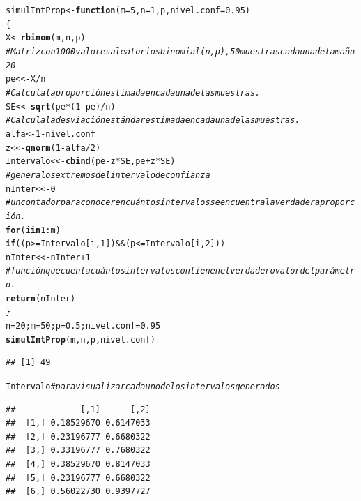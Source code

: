 \documentclass[12pt,letterpaper]{article}\usepackage[]{graphicx}\usepackage[]{color}
\makeatletter
\newcommand{\hlnum}[1]{\textcolor[rgb]{0.686,0.059,0.569}{#1}}%
\newcommand{\hlcom}[1]{\textcolor[rgb]{0.678,0.584,0.686}{\textit{#1}}}%
\newcommand{\hlopt}[1]{\textcolor[rgb]{0,0,0}{#1}}%
\newcommand{\hlstd}[1]{\textcolor[rgb]{0.345,0.345,0.345}{#1}}%
\newcommand{\hlkwa}[1]{\textcolor[rgb]{0.161,0.373,0.58}{\textbf{#1}}}%
\newcommand{\hlkwb}[1]{\textcolor[rgb]{0.69,0.353,0.396}{#1}}%
\newcommand{\hlkwc}[1]{\textcolor[rgb]{0.333,0.667,0.333}{#1}}%
\newcommand{\hlkwd}[1]{\textcolor[rgb]{0.737,0.353,0.396}{\textbf{#1}}}%
\newenvironment{kframe}{%
 \def\at@end@of@kframe{}%
 \ifinner\ifhmode%
  \def\at@end@of@kframe{\end{minipage}}%
  \begin{minipage}{\columnwidth}%
 \fi\fi%
 \def\FrameCommand##1{\hskip\@totalleftmargin \hskip-\fboxsep
 \colorbox{shadecolor}{##1}\hskip-\fboxsep
     \hskip-\linewidth \hskip-\@totalleftmargin \hskip\columnwidth}%
 \MakeFramed {\advance\hsize-\width
   \@totalleftmargin\z@ \linewidth\hsize
   \@setminipage}}%
 {\par\unskip\endMakeFramed%
 \at@end@of@kframe}
\newenvironment{knitrout}{}{} %
\makeatother
\begin{document}
\begin{knitrout}
\color{fgcolor}\begin{kframe}
\begin{alltt}
\hlstd{simulIntProp} \hlkwb{<-} \hlkwa{function}\hlstd{(}\hlkwc{m}\hlstd{=}\hlnum{5}\hlstd{,} \hlkwc{n}\hlstd{=}\hlnum{1}\hlstd{,} \hlkwc{p}\hlstd{,} \hlkwc{nivel.conf}\hlstd{=}\hlnum{0.95}\hlstd{)}
\hlstd{\{}
\hlstd{X} \hlkwb{<-} \hlkwd{rbinom}\hlstd{(m, n, p)}
\hlcom{# Matriz con 1000 valores aleatorios binomial(n,p), 50 muestras cada una de tamaño 20 }
\hlstd{pe} \hlkwb{<<-} \hlstd{X}\hlopt{/}\hlstd{n}
 \hlcom{# Calcula la proporción estimada en cada una de las muestras. }
\hlstd{SE} \hlkwb{<<-} \hlkwd{sqrt}\hlstd{(pe}\hlopt{*}\hlstd{(}\hlnum{1}\hlopt{-}\hlstd{pe)}\hlopt{/}\hlstd{n)}
\hlcom{# Calcula la desviación estándar estimada en cada una de las muestras. }
\hlstd{alfa} \hlkwb{<-} \hlnum{1}\hlopt{-}\hlstd{nivel.conf}
\hlstd{z} \hlkwb{<<-} \hlkwd{qnorm}\hlstd{(}\hlnum{1}\hlopt{-}\hlstd{alfa}\hlopt{/}\hlnum{2}\hlstd{)}
\hlstd{Intervalo} \hlkwb{<<-} \hlkwd{cbind}\hlstd{(pe} \hlopt{-} \hlstd{z}\hlopt{*}\hlstd{SE, pe} \hlopt{+} \hlstd{z}\hlopt{*}\hlstd{SE)}
\hlcom{# genera los extremos del intervalo de confianza }
\hlstd{nInter} \hlkwb{<<-} \hlnum{0}
\hlcom{# un contador para conocer en cuántos intervalos se encuentra la verdadera proporción. }
\hlkwa{for}\hlstd{(i} \hlkwa{in} \hlnum{1}\hlopt{:}\hlstd{m)}
\hlkwa{if} \hlstd{((p} \hlopt{>=} \hlstd{Intervalo[i,} \hlnum{1}\hlstd{])} \hlopt{&&} \hlstd{(p} \hlopt{<=} \hlstd{Intervalo[i,} \hlnum{2}\hlstd{]))}
\hlstd{nInter} \hlkwb{<<-} \hlstd{nInter} \hlopt{+} \hlnum{1}
\hlcom{# función que cuenta cuántos intervalos contienen el verdadero valor del parámetro. }
\hlkwd{return}\hlstd{(nInter)}
\hlstd{\}}
\hlstd{n}\hlkwb{=}\hlnum{20}\hlstd{; m}\hlkwb{=} \hlnum{50}\hlstd{; p}\hlkwb{=}\hlnum{0.5}\hlstd{; nivel.conf}\hlkwb{=}\hlnum{0.95}
\hlkwd{simulIntProp}\hlstd{(m, n, p, nivel.conf)}
\end{alltt}
\begin{verbatim}
## [1] 49
\end{verbatim}
\begin{alltt}
\hlstd{Intervalo} \hlcom{# para visualizar cada uno de los intervalos generados }
\end{alltt}
\begin{verbatim}
##             [,1]      [,2]
##  [1,] 0.18529670 0.6147033
##  [2,] 0.23196777 0.6680322
##  [3,] 0.33196777 0.7680322
##  [4,] 0.38529670 0.8147033
##  [5,] 0.23196777 0.6680322
##  [6,] 0.56022730 0.9397727

\end{verbatim}
\end{kframe}
\end{knitrout}
\end{document}
